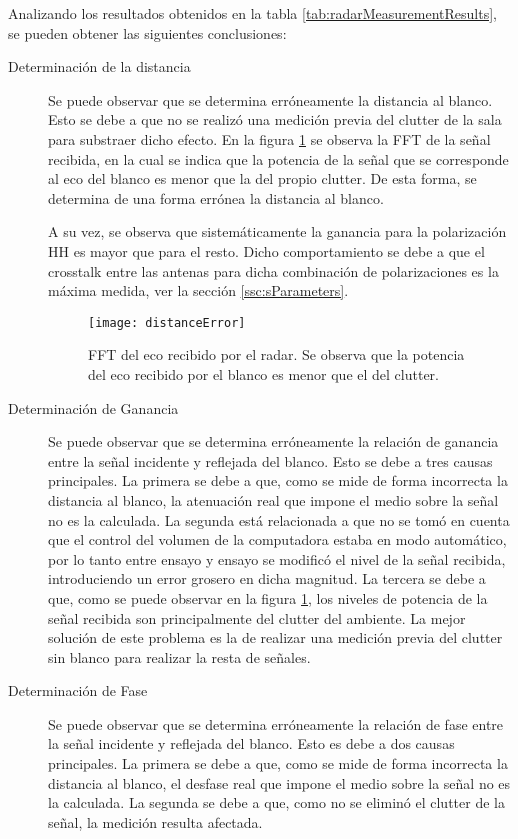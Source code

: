 Analizando los resultados obtenidos en la tabla \ref{tab:radarMeasurementResults}, se pueden obtener las siguientes conclusiones:
\begin{description}
  \item[Determinación de la distancia] Se puede observar que se determina erróneamente la distancia al blanco. Esto se debe a que no se realizó una medición previa del clutter de la sala para substraer dicho efecto. En la figura \ref{fig:distanceError} se observa la FFT de la señal recibida, en la cual se indica que la potencia de la señal que se corresponde al eco del blanco es menor que la del propio clutter. De esta forma, se determina de una forma errónea la distancia al blanco.

  A su vez, se observa que sistemáticamente la ganancia para la polarización HH es mayor que para el resto. Dicho comportamiento se debe a que el crosstalk entre las antenas para dicha combinación de polarizaciones es la máxima medida, ver la sección \ref{ssc:sParameters}.

  \begin{figure}[H]
    \centering
    \texttt{[image: distanceError]}
    \caption{FFT del eco recibido por el radar. Se observa que la potencia del eco recibido por el blanco es menor que el del clutter.}
    \label{fig:distanceError}
  \end{figure}

  \item[Determinación de Ganancia] Se puede observar que se determina erróneamente la relación de ganancia entre la señal incidente y reflejada del blanco. Esto se debe a tres causas principales. La primera se debe a que, como se mide de forma incorrecta la distancia al blanco, la atenuación real que impone el medio sobre la señal no es la calculada. La segunda está relacionada a que no se tomó en cuenta que el control del volumen de la computadora estaba en modo automático, por lo tanto entre ensayo y ensayo se modificó el nivel de la señal recibida, introduciendo un error grosero en dicha magnitud. La tercera se debe a que, como se puede observar en la figura \ref{fig:distanceError}, los niveles de potencia de la señal recibida son principalmente del clutter del ambiente. La mejor solución de este problema es la de realizar una medición previa del clutter sin blanco para realizar la resta de señales.

  \item[Determinación de Fase] Se puede observar que se determina erróneamente la relación de fase entre la señal incidente y reflejada del blanco. Esto es debe a dos causas principales. La primera se debe a que, como se mide de forma incorrecta la distancia al blanco, el desfase real que impone el medio sobre la señal no es la calculada. La segunda se debe a que, como no se eliminó el clutter de la señal, la medición resulta afectada.
\end{description}


